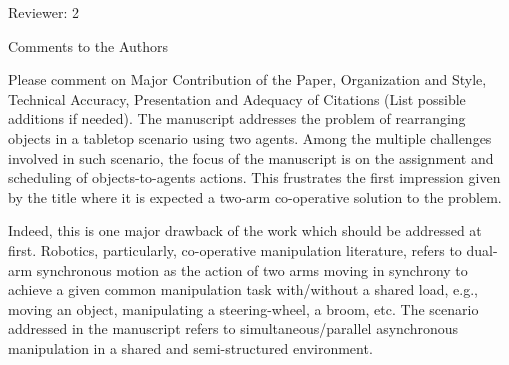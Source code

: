 \documentclass[journal]{IEEEtran}
\begin{document}
	\vspace{0.5in}
	
	\begin{partt}
		Reviewer: 2
		
		Comments to the Authors
		
		Please comment on Major Contribution of the Paper, Organization and Style, Technical Accuracy, Presentation and Adequacy of Citations (List possible additions if needed).
		The manuscript addresses the problem of rearranging objects in a tabletop scenario using two agents. Among the multiple challenges involved in such scenario, the focus of the manuscript is on the assignment and scheduling of objects-to-agents actions. This frustrates the first impression given by the title where it is expected a two-arm co-operative solution to the problem.
	\end{partt}
	
	\begin{partt}
		Indeed, this is one major drawback of the work which should be addressed at first. Robotics, particularly, co-operative manipulation literature, refers to dual-arm synchronous motion as the action of two arms moving in synchrony to achieve a given common manipulation task with/without a shared load, e.g., moving an object, manipulating a steering-wheel, a broom, etc. The scenario addressed in the manuscript refers to simultaneous/parallel asynchronous manipulation in a shared and semi-structured environment.  
	\end{partt}
	
\end{document}
